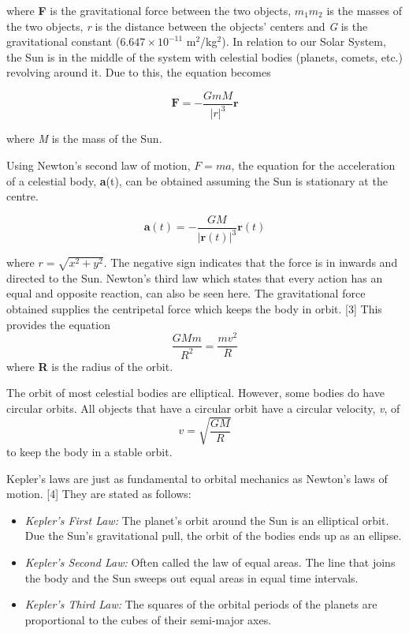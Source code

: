 \documentclass[11 pt, a4paper]{article}
\begin{document}
where \textbf{F} is the gravitational force between the two objects, $m_1m_2$ is the masses of the two objects, \textit{r} is the distance 
between the objects' centers and \textit{G} is the gravitational constant ($6.647 \times 10^{-11}$ m$^2$/kg$^2$). In relation to our Solar 
System, the Sun is in the middle of the system with celestial bodies (planets, comets, etc.) revolving around it. Due to this, the equation 
becomes

\[
\mathbf{F} = -\frac{GmM}{|r|^3}\mathbf{r}
\tag{Eq. 1b}
\]

where \textit{M} is the mass of the Sun.

Using Newton's second law of motion, $F=ma$, the equation for the acceleration of a celestial body, \textbf{a}(t), can be obtained assuming 
the Sun is stationary at the centre.

\[
\mathbf{a}(t) = -\frac{GM}{|\mathbf{r}(t)|^3}\mathbf{r}(t)
\tag{Eq. 2}
\]

where $r = \sqrt{x^2 +y^2}$.
The negative sign indicates that the force is in inwards and directed to the Sun. Newton's third law which states that every action has an 
equal and opposite reaction, can also be seen here. The gravitational force obtained supplies the centripetal force which keeps the body in 
orbit. [3] This provides the equation
\[
\frac{GMm}{R^2} = \frac{mv^2}{R}
\tag{Eq. 3}
\]
where \textbf{R} is the radius of the orbit.

The orbit of most celestial bodies are elliptical. However, some bodies do have circular orbits. All objects that have a circular orbit have a
circular velocity, \textit{v}, of
\[
v = \sqrt{\frac{GM}{R}}
\tag{Eq. 4}
\]
to keep the body in a stable orbit.

Kepler's laws are just as fundamental to orbital mechanics as Newton's laws of motion. [4] They are stated as follows:
\begin{itemize}
    \item \textit{Kepler's First Law:} The planet's orbit around the Sun is an elliptical orbit. Due the Sun's gravitational pull, the orbit of the bodies ends up as an ellipse.
    \item \textit{Kepler's Second Law:} Often called the law of equal areas. The line that joins the body and the Sun sweeps out equal areas in equal time intervals.
    \item \textit{Kepler's Third Law:} The squares of the orbital periods of the planets are proportional to the cubes of their semi-major axes.
\end{itemize}
\end{document}
